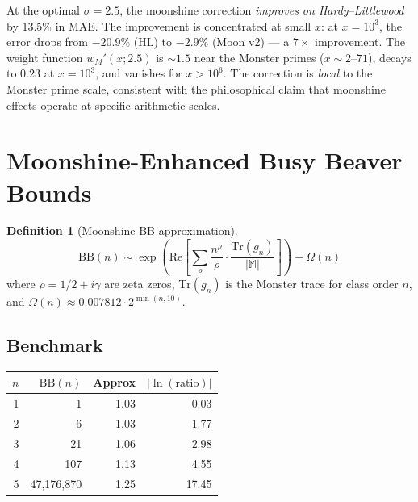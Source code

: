 \documentclass[11pt]{amsart}
\theoremstyle{definition}
\newtheorem{definition}[theorem]{Definition}
\begin{document}
At the optimal $\sigma = 2.5$, the moonshine correction \emph{improves on Hardy--Littlewood} by 13.5\% in MAE. The improvement is concentrated at small $x$: at $x = 10^3$, the error drops from $-20.9\%$ (HL) to $-2.9\%$ (Moon v2) --- a $7\times$ improvement. The weight function $w_M'(x; 2.5)$ is $\sim 1.5$ near the Monster primes ($x \sim 2$--$71$), decays to $0.23$ at $x = 10^3$, and vanishes for $x > 10^6$. The correction is \emph{local} to the Monster prime scale, consistent with the philosophical claim that moonshine effects operate at specific arithmetic scales.


\section{Moonshine-Enhanced Busy Beaver Bounds}
\label{sec:bb}

\begin{definition}[Moonshine BB approximation]
\begin{equation}
\mathrm{BB}(n) \sim \exp\!\left(\mathrm{Re}\!\left[\sum_{\rho} \frac{n^{\rho}}{\rho} \cdot \frac{\mathrm{Tr}(g_n)}{|\mathbb{M}|}\right]\right) + \Omega(n)
\end{equation}
where $\rho = 1/2 + i\gamma$ are zeta zeros, $\mathrm{Tr}(g_n)$ is the Monster trace for class order $n$, and $\Omega(n) \approx 0.007812 \cdot 2^{\min(n,10)}$.
\end{definition}

\subsection{Benchmark}

\begin{center}
\begin{tabular}{r r r r}
\toprule
$n$ & $\mathrm{BB}(n)$ & Approx & $|\ln(\text{ratio})|$ \\
\midrule
1 & 1 & 1.03 & 0.03 \\
2 & 6 & 1.03 & 1.77 \\
3 & 21 & 1.06 & 2.98 \\
4 & 107 & 1.13 & 4.55 \\
5 & 47{,}176{,}870 & 1.25 & 17.45 \\
\bottomrule
\end{tabular}
\end{center}
\end{document}
